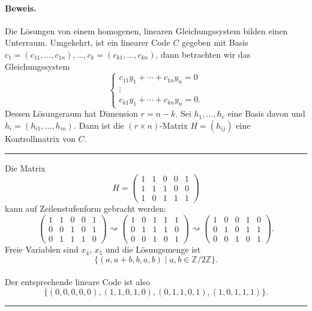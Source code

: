 \documentclass[9pt]{article}
\begin{document}
\begin{satz}
\paragraph{Beweis.}  
Die Lösungen von einem homogenen, linearen Gleichungssystem bilden einen Unterraum.  
Umgekehrt, ist ein linearer Code $C$ gegeben mit Basis  
$c_1 = (c_{11}, \dots, c_{1n}), \dots, c_k = (c_{k1}, \dots, c_{kn})$,  
dann betrachten wir das Gleichungssystem  
\[
\begin{cases}
c_{11}y_1 + \cdots + c_{1n}y_n = 0 \\
\vdots \\
c_{k1}y_1 + \cdots + c_{kn}y_n = 0.
\end{cases}
\]  
Dessen Lösungsraum hat Dimension $r = n - k$. Sei $h_1, \dots, h_r$ eine Basis davon und $h_i = (h_{i1}, \dots, h_{in})$. Dann ist die $(r \times n)$-Matrix $H = (h_{ij})$ eine Kontrollmatrix von $C$.  
 \end{satz} \noindent \rule{8cm}{0.4pt}

\begin{bsp}
Die Matrix  
\[
H = \begin{pmatrix}
1 & 1 & 0 & 0 & 1 \\
1 & 1 & 1 & 0 & 0 \\
1 & 0 & 1 & 1 & 1
\end{pmatrix}
\]
kann auf Zeilenstufenform gebracht werden: 
\scriptsize
\[
\begin{pmatrix}
1 & 1 & 0 & 0 & 1 \\
0 & 0 & 1 & 0 & 1 \\
0 & 1 & 1 & 1 & 0
\end{pmatrix}
\rightsquigarrow
\begin{pmatrix}
1 & 0 & 1 & 1 & 1 \\
0 & 1 & 1 & 1 & 0 \\
0 & 0 & 1 & 0 & 1
\end{pmatrix}
\rightsquigarrow
\begin{pmatrix}
1 & 0 & 0 & 1 & 0 \\
0 & 1 & 0 & 1 & 1 \\
0 & 0 & 1 & 0 & 1
\end{pmatrix}.
\]
\normalsize
Freie Variablen sind $x_4$, $x_5$ und die Lösungsmenge ist    
\[
\{(a, a + b, b, a, b) \mid a, b \in \mathbb{Z}/2\mathbb{Z}\}.
\]
\\
Der entsprechende lineare Code ist also  
\[
\{(0, 0, 0, 0, 0), (1, 1, 0, 1, 0), (0, 1, 1, 0, 1), (1, 0, 1, 1, 1)\}.
\]  
\end{bsp} \noindent \rule{8cm}{0.4pt}
\end{document}
